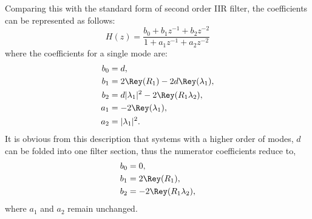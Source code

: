 Comparing this with the standard form of second order IIR filter, the coefficients can be represented as follows:
\begin{equation}
\label{eq:iir-filter}
H(z) = \frac{b_0 + b_1 z^{-1} + b_2 z^{-2}}{1 + a_1 z^{-1} + a_2 z^{-2}}
\end{equation}
where the coefficients for a single mode are:
\begin{subequations}
\label{eq:biquad-coeffs}
\begin{align}
    b_0 &= d, \\
    b_1 &= 2\Rey(R_1) - 2d\Rey(\lambda_1), \\
    b_2 &= d|\lambda_1|^2 - 2\Rey(R_1\lambda_2), \\
    a_1 &= -2\Rey(\lambda_1), \\
    a_2 &= |\lambda_1|^2.
\end{align}
\end{subequations}
It is obvious from this description that systems with a higher order of modes, $d$ can be folded into one filter section, thus the numerator coefficients reduce to,
\begin{subequations}
\label{eq:biquad-coeffs-2}
\begin{align}
    b_0 &= 0, \\
    b_1 &= 2\Rey(R_1), \\
    b_2 &= -2\Rey(R_1\lambda_2), \\
\end{align}
\end{subequations}
where $a_1$ and $a_2$ remain unchanged.

